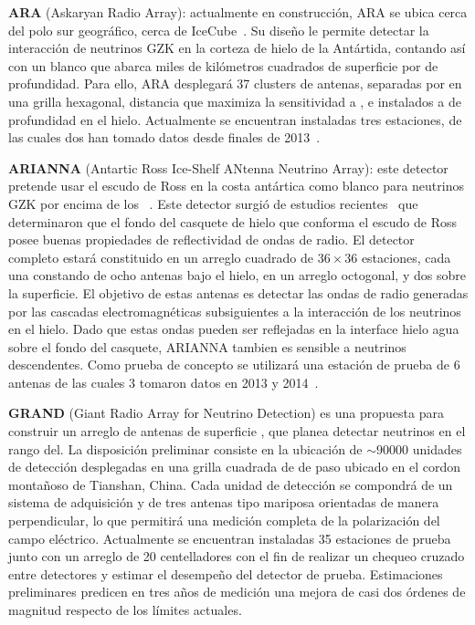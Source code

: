 	\textbf{ARA} (Askaryan Radio Array): actualmente en construcci\'on, ARA se ubica cerca del polo sur geogr\'afico, cerca de IceCube~\cite{cite:ARA}.
	Su dise\~no le permite detectar la interacci\'on de neutrinos GZK en la corteza de hielo de la Ant\'artida, contando as\'i con un blanco que abarca miles de kil\'ometros cuadrados de superficie por  de profundidad.
	Para ello, ARA desplegar\'a 37 clusters de antenas, separadas por  en una grilla hexagonal, distancia que maximiza la sensitividad a , e instalados a  de profundidad en el hielo.
	Actualmente se encuentran instaladas tres estaciones, de las cuales dos han tomado datos desde finales de 2013~\cite{cite:ARA2}.
	
	\textbf{ARIANNA} (Antartic Ross Ice-Shelf ANtenna Neutrino Array): este detector pretende usar el escudo de Ross en la costa ant\'artica como blanco para neutrinos GZK por encima de los ~\cite{cite:ARIANNA}.
	Este detector surgi\'o de estudios recientes~\cite{cite:ARIANNA2} que determinaron que el fondo del casquete de hielo que conforma el escudo de Ross posee buenas propiedades de reflectividad de ondas de radio.
	El detector completo estar\'a constituido en un arreglo cuadrado de $36\times36$ estaciones, cada una constando de ocho antenas bajo el hielo, en un arreglo octogonal, y dos sobre la superficie.
	El objetivo de estas antenas es detectar las ondas de radio generadas por las cascadas electromagn\'eticas subsiguientes a la interacci\'on de los neutrinos en el hielo. Dado que estas ondas pueden ser reflejadas en la interface hielo agua sobre el fondo del casquete, ARIANNA tambien es sensible a neutrinos descendentes.
	Como prueba de concepto se utilizar\'a una estaci\'on de prueba de 6 antenas de las cuales 3 tomaron datos en 2013 y 2014~\cite{cite:ARIANNA3}.
	
	\textbf{GRAND} (Giant Radio Array for Neutrino Detection) es una propuesta para construir un arreglo de antenas de superficie , que planea detectar neutrinos en el rango del. 
	La disposici\'on preliminar consiste en la ubicaci\'on de $\sim90000$ unidades de detecci\'on desplegadas en una grilla cuadrada de  de paso ubicado en el cordon monta\~noso de Tianshan, China.
	Cada unidad de detecci\'on se compondr\'a de un sistema de adquisici\'on y de tres antenas tipo mariposa orientadas de manera perpendicular, lo que permitir\'a una medici\'on completa de la polarizaci\'on del campo el\'ectrico. 
	Actualmente se encuentran instaladas 35 estaciones de prueba junto con un arreglo de 20 centelladores con el fin de realizar un chequeo cruzado entre detectores y estimar el desempe\~no del detector de prueba.
	Estimaciones preliminares predicen en tres a\~nos de medici\'on una mejora de casi dos \'ordenes de magnitud respecto de los l\'imites actuales.
	

